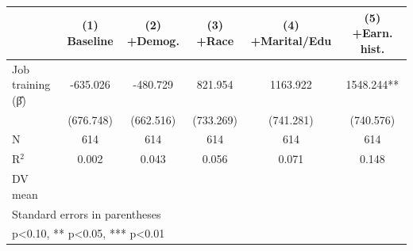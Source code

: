 \begin{table}[htbp]
\centering
\begin{tabular}{lccccc}
\hline\hline
 & (1) Baseline & (2) +Demog. & (3) +Race & (4) +Marital/Edu & (5) +Earn. hist. \\
\hline
Job training (β̂) & -635.026 & -480.729 & 821.954 & 1163.922 & 1548.244** \\
 & (676.748) & (662.516) & (733.269) & (741.281) & (740.576) \\
\hline
N & 614 & 614 & 614 & 614 & 614 \\
R$^2$ & 0.002 & 0.043 & 0.056 & 0.071 & 0.148 \\
DV mean &  &  &  &  &  \\
\hline\hline
\multicolumn{6}{l}{\footnotesize Standard errors in parentheses} \\
\multicolumn{6}{l}{\footnotesize * p<0.10, ** p<0.05, *** p<0.01} \\
\end{tabular}
\end{table}